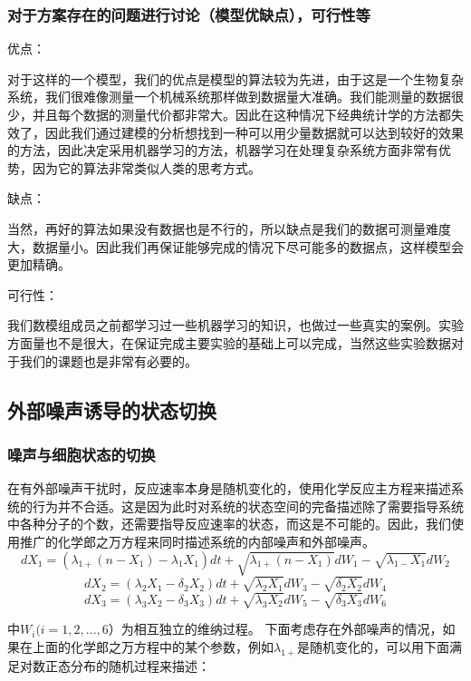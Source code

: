\documentclass[withoutpreface,bwprint]{cumcmthesis} %
\begin{document}
\subsubsection{对于方案存在的问题进行讨论（模型优缺点），可行性等}
\begin{tabbing}
优点：
\end{tabbing}

对于这样的一个模型，我们的优点是模型的算法较为先进，由于这是一个生物复杂系统，我们很难像测量一个机械系统那样做到数据量大准确。我们能测量的数据很少，并且每个数据的测量代价都非常大。因此在这种情况下经典统计学的方法都失效了，因此我们通过建模的分析想找到一种可以用少量数据就可以达到较好的效果的方法，因此决定采用机器学习的方法，机器学习在处理复杂系统方面非常有优势，因为它的算法非常类似人类的思考方式。

\begin{tabbing}
	缺点：
\end{tabbing}

当然，再好的算法如果没有数据也是不行的，所以缺点是我们的数据可测量难度大，数据量小。因此我们再保证能够完成的情况下尽可能多的数据点，这样模型会更加精确。

\begin{tabbing}
	可行性：
\end{tabbing}
	
我们数模组成员之前都学习过一些机器学习的知识，也做过一些真实的案例。实验方面量也不是很大，在保证完成主要实验的基础上可以完成，当然这些实验数据对于我们的课题也是非常有必要的。


\subsection{外部噪声诱导的状态切换}
\subsubsection{噪声与细胞状态的切换}
在有外部噪声干扰时，反应速率本身是随机变化的，使用化学反应主方程来描述系统的行为并不合适。这是因为此时对系统的状态空间的完备描述除了需要指导系统中各种分子的个数，还需要指导反应速率的状态，而这是不可能的。因此，我们使用推广的化学郎之万方程来同时描述系统的内部噪声和外部噪声。
$$dX_1=(\lambda_{1+}(n-X_1)-\lambda_1 X_1)dt+\sqrt{\lambda_{1+}(n-X_1)}dW_1-\sqrt{\lambda_{1-}X_1}dW_2$$
$$dX_2 = (\lambda_2X_1-\delta_2X_2)dt+\sqrt{\lambda_2X_1}dW_3-\sqrt{\delta_2 X_2}dW_4$$
$$dX_3=(\lambda_3X_2-\delta_3X_3)dt+\sqrt{\lambda_3X_2}dW_5-\sqrt{\delta_3X_3}dW_6$$

中$W_i(i=1,2,...,6）$为相互独立的维纳过程。	
下面考虑存在外部噪声的情况，如果在上面的化学郎之万方程中的某个参数，例如$\lambda_{1+}$是随机变化的，可以用下面满足对数正态分布的随机过程来描述：
\end{document}
